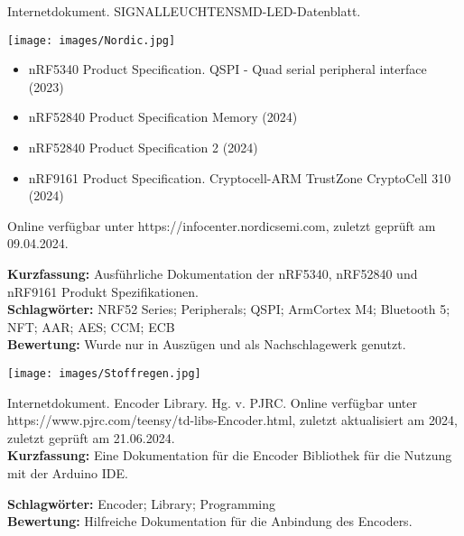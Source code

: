 {
Internetdokument. SIGNALLEUCHTENSMD-LED-Datenblatt. \\
\begin{minipage}{0.38\textwidth}
	\texttt{[image: images/Nordic.jpg]}
\end{minipage}
\hfill
\begin{minipage}{0.6\textwidth}
\begin{itemize}
	\item nRF5340 Product Specification. QSPI - Quad serial peripheral interface (2023)
	\item nRF52840 Product Specification Memory (2024)
	\item nRF52840 Product Specification 2 (2024)
	\item nRF9161 Product Specification. Cryptocell-ARM TrustZone CryptoCell 310 (2024)
\end{itemize}
Online verfügbar unter https://infocenter.nordicsemi.com, zuletzt geprüft am 09.04.2024.
\end{minipage}
\textbf{Kurzfassung:}
Ausführliche Dokumentation der nRF5340, nRF52840 und nRF9161 Produkt Spezifikationen.
\\ \textbf{Schlagwörter:}
NRF52 Series; Peripherals; QSPI; ArmCortex M4; Bluetooth 5; NFT; AAR; AES; CCM; ECB
\\ \textbf{Bewertung:}
Wurde nur in Auszügen und als Nachschlagewerk genutzt. 
}

{
	\begin{minipage}{0.38\textwidth}
		\texttt{[image: images/Stoffregen.jpg]}
	\end{minipage}
	\hfill
	\begin{minipage}{0.6\textwidth}
		Internetdokument. Encoder Library. Hg. v. PJRC. Online verfügbar unter https://www.pjrc.com/teensy/td-libs-Encoder.html, zuletzt aktualisiert am 2024, zuletzt geprüft am 21.06.2024.
		\\ \textbf{Kurzfassung:}
		Eine Dokumentation für die Encoder Bibliothek für die Nutzung mit der Arduino IDE.
	\end{minipage}
	\textbf{Schlagwörter:}
	Encoder; Library; Programming
	\\ \textbf{Bewertung:}
	Hilfreiche Dokumentation für die Anbindung des Encoders.
}


